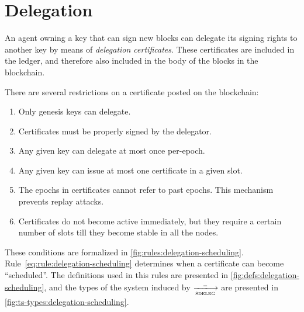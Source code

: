 \section{Delegation}
\label{sec:delegation}

\newcommand{\DEnv}{\type{DEnv}}
\newcommand{\DSEnv}{\type{DSEnv}}
\newcommand{\DSState}{\type{DSState}}
\newcommand{\DCert}{\type{DCert}}
\newcommand{\DState}{\type{DState}}
\newcommand{\DEState}{\type{DEState}}

An agent owning a key that can sign new blocks can delegate its signing rights
to another key by means of \textit{delegation certificates}. These certificates
are included in the ledger, and therefore also included in the body of the
blocks in the blockchain.

There are several restrictions on a certificate posted on the blockchain:
\begin{enumerate}
\item Only genesis keys can delegate.
\item Certificates must be properly signed by the delegator.
\item Any given key can delegate at most once per-epoch.
\item Any given key can issue at most one certificate in a given slot.
\item The epochs in certificates cannot refer to past epochs. This mechanism
  prevents replay attacks.
\item Certificates do not become active immediately, but they require a certain
  number of slots till they become stable in all the nodes.
\end{enumerate}
These conditions are formalized in \cref{fig:rules:delegation-scheduling}.
Rule~\ref{eq:rule:delegation-scheduling} determines when a certificate can
become ``scheduled''. The definitions used in this rules are presented in
\cref{fig:defs:delegation-scheduling}, and the types of the system induced by
$\trans{sdeleg}{\wcard}$ are presented in
\cref{fig:ts-types:delegation-scheduling}.

